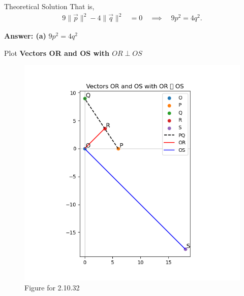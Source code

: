 \documentclass{beamer}
\begin{document}
\begin{frame}{Theoretical Solution}
That is,
\begin{align*}
9\|\vec{p}\|^2 - 4\|\vec{q}\|^2 &= 0 
\quad \implies \quad 
9p^2 = 4q^2.
\end{align*}

\textbf{Answer: (a)} $9p^2 = 4q^2$
\end{frame}

\begin{frame}{Plot}
\centering
\textbf{Vectors OR and OS with $OR \perp OS$}
\begin{figure}[h!]
    \centering
    \includegraphics[width=0.6\columnwidth]{figs/fig1.png}
    \caption{Figure for 2.10.32}
\end{figure}
\end{frame}
\end{document}
